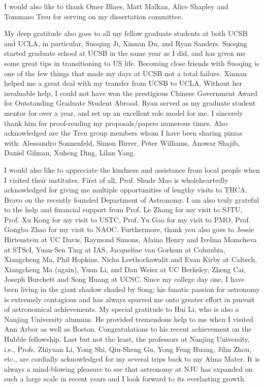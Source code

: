I would also like to thank Omer Blaes, Matt Malkan, Alice Shapley and Tommaso Treu for serving on my dissertation
committee.

My deep gratitude also goes to all my fellow graduate students at both UCSB and UCLA, in particular, Suoqing Ji,
Xinnan Du, and Ryan Sanders.
Suoqing started graduate school at UCSB in the same year as I did, and has given me some great tips in
transitioning to US life.
Becoming close friends with Suoqing is one of the few things that made my days at UCSB not a total failure.
Xinnan helped me a great deal with my transfer from UCSB to UCLA.
Without her invaluable help, I could not have won the prestigious Chinese Government Award for Outstanding
Graduate Student Abroad.
Ryan served as my graduate student mentor for over a year, and set up an excellent role model for me.
I sincerely thank him for proof-reading my proposals/papers numerous times.
Also acknowledged are the Treu group members whom I have been sharing pizzas with:
Alessandro Sonnenfeld, Simon Birrer, Peter Williams, Anowar Shajib, Daniel Gilman, Xuheng Ding, Lilan Yang.

I would also like to appreciate the kindness and assistance from local people when I visited their institutes.
First of all, Prof. Shude Mao is wholeheartedly acknowledged for giving me multiple opportunities of lengthy visits to THCA.
Bravo on the recently founded Department of Astronomy.
I am also truly grateful to the help and financial support from Prof. Le Zhang for my visit to SJTU, 
Prof. Xu Kong for my visit to USTC, Prof. Yu Gao for my visit to PMO, Prof. Gongbo Zhao for my visit to NAOC.
Furthermore, thank you also goes to Jessie Hirtenstein at UC Davis,
Raymond Simons, Alaina Henry and Ivelina Momcheva at STScI,
Yuan-Sen Ting at IAS,
Jacqueline van Gorkom at Columbia,
Xiangcheng Ma, Phil Hopkins, Nicha Leethochawalit and Evan Kirby at Caltech,
Xiangcheng Ma (again), Yuan Li, and Dan Weisz at UC Berkeley,
Zheng Cai, Joseph Burchett and Song Huang at UCSC.
Since my college day one, I have been living in the giant shadow shaded by Song; 
his fanatic passion for astronomy is extremely contagious and has always spurred me onto greater effort in
pursuit of astronomical achievements.
My special gratitude to Hui Li, who is also a Nanjing University alumnus.
He provided tremendous help to me when I visited Ann Arbor as well as Boston.
Congratulations to his recent achievement on the Hubble fellowship.
Last but not the least, the professors at Nanjing University, i.e., Profs. Zhiyuan Li, Yong Shi, Qiu-Sheng Gu,
Yong Feng Huang, Jilin Zhou, etc., are cordially acknowledged for my several trips back to my Alma Mater.
It is always a mind-blowing pleasure to see that astronomy at NJU has expanded on such a large scale in recent
years and I look forward to its everlasting growth.


